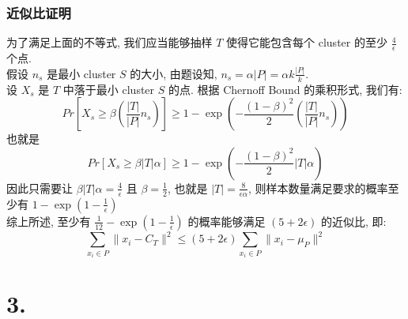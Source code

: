 \documentclass[UTF8]{article}
\begin{document}
\subsubsection*{近似比证明}
\noindent 为了满足上面的不等式, 我们应当能够抽样 $T$ 使得它能包含每个 cluster 的至少 $\frac{4}{\epsilon}$ 个点. \\
假设 $n_s$ 是最小 cluster $S$ 的大小, 由题设知, $n_s=\alpha|P|=\alpha k\frac{|P|}{k}$. \\
设 $X_s$ 是 $T$ 中落于最小 cluster $S$ 的点. 根据 Chernoff Bound 的乘积形式, 我们有:
$$Pr\left[X_s \ge \beta\left(\frac{|T|}{|P|}n_s\right)\right] \ge 1 - \exp\left(-\frac{(1-\beta)^2}{2}\left(\frac{|T|}{|P|}n_s\right)\right)$$
也就是
$$Pr\left[X_s \ge \beta|T|\alpha\right] \ge 1 - \exp\left(-\frac{(1-\beta)^2}{2}|T|\alpha\right)$$
因此只需要让 $\beta|T|\alpha=\frac{4}{\epsilon}$ 且 $\beta=\frac{1}{2}$, 也就是 $|T|=\frac{8}{\epsilon\alpha}$, 则样本数量满足要求的概率至少有 $1-\exp(1-\frac{1}{\epsilon})$\\
\noindent
综上所述, 至少有 $\frac{1}{12} - \exp(1-\frac{1}{\epsilon})$ 的概率能够满足 $(5+2\epsilon)$ 的近似比, 即:
$$\sum\limits_{x_i\in P}\|x_i-C_T\|^2 \le (5+2\epsilon)\sum\limits_{x_i\in P}\|x_i-\mu_P\|^2$$

\newpage
\section*{3.}
\end{document}
